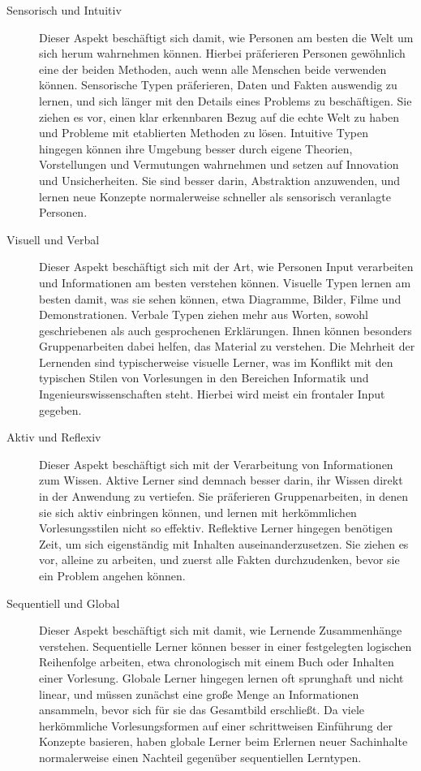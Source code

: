 \begin{description}
    \item[Sensorisch und Intuitiv] Dieser Aspekt beschäftigt sich damit, wie Personen am besten die Welt um sich herum wahrnehmen können. Hierbei präferieren Personen gewöhnlich eine der beiden Methoden, auch wenn alle Menschen beide verwenden können. Sensorische Typen präferieren, Daten und Fakten auswendig zu lernen, und sich länger mit den Details eines Problems zu beschäftigen. Sie ziehen es vor, einen klar erkennbaren Bezug auf die echte Welt zu haben und Probleme mit etablierten Methoden zu lösen. Intuitive Typen hingegen können ihre Umgebung besser durch eigene Theorien, Vorstellungen und Vermutungen wahrnehmen und setzen auf Innovation und Unsicherheiten. Sie sind besser darin, Abstraktion anzuwenden, und lernen neue Konzepte normalerweise schneller als sensorisch veranlagte Personen.
    \item[Visuell und Verbal] Dieser Aspekt beschäftigt sich mit der Art, wie Personen Input verarbeiten und Informationen am besten verstehen können. Visuelle Typen lernen am besten damit, was sie sehen können, etwa Diagramme, Bilder, Filme und Demonstrationen. Verbale Typen ziehen mehr aus Worten, sowohl geschriebenen als auch gesprochenen Erklärungen. Ihnen können besonders Gruppenarbeiten dabei helfen, das Material zu verstehen. Die Mehrheit der Lernenden sind typischerweise visuelle Lerner, was im Konflikt mit den typischen Stilen von Vorlesungen in den Bereichen Informatik und Ingenieurswissenschaften steht. Hierbei wird meist ein frontaler Input gegeben.
    \item[Aktiv und Reflexiv]  Dieser Aspekt beschäftigt sich mit der Verarbeitung von Informationen zum Wissen. Aktive Lerner sind demnach besser darin, ihr Wissen direkt in der Anwendung zu vertiefen. Sie präferieren Gruppenarbeiten, in denen sie sich aktiv einbringen können, und lernen mit herkömmlichen Vorlesungsstilen nicht so effektiv. Reflektive Lerner hingegen benötigen Zeit, um sich eigenständig mit Inhalten auseinanderzusetzen. Sie ziehen es vor, alleine zu arbeiten, und zuerst alle Fakten durchzudenken, bevor sie ein Problem angehen können.
    \item[Sequentiell und Global] Dieser Aspekt beschäftigt sich mit damit, wie Lernende Zusammenhänge verstehen. Sequentielle Lerner können besser in einer festgelegten logischen Reihenfolge arbeiten, etwa chronologisch mit einem Buch oder Inhalten einer Vorlesung. Globale Lerner hingegen lernen oft sprunghaft und nicht linear, und müssen zunächst eine große Menge an Informationen ansammeln, bevor sich für sie das Gesamtbild erschließt. Da viele herkömmliche Vorlesungsformen auf einer schrittweisen Einführung der Konzepte basieren, haben globale Lerner beim Erlernen neuer Sachinhalte normalerweise einen Nachteil gegenüber sequentiellen Lerntypen.
\end{description}

